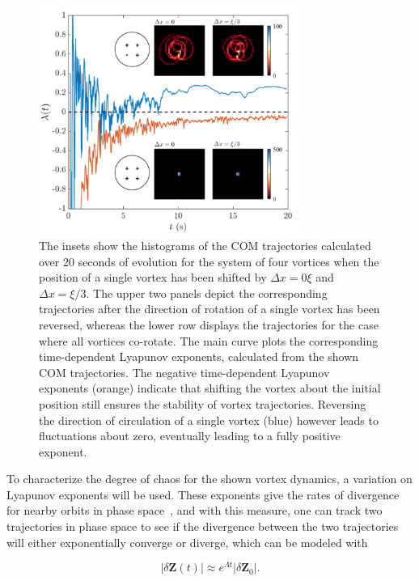 \begin{figure}
\center \includegraphics[width=0.75\textwidth]{data/2d/lyap/lyap}

\caption{
The insets show the histograms of the COM trajectories calculated over 20 seconds of evolution for the system of four vortices when the position of a single vortex has been shifted by $\Delta x=0\xi$ and $\Delta x=\xi/3$.
The upper two panels depict the corresponding trajectories after the direction of rotation of a single vortex has been reversed, whereas the lower row displays the trajectories for the case where all vortices co-rotate.
The main curve plots the corresponding time-dependent Lyapunov exponents,  calculated from the shown COM trajectories. 
The negative time-dependent Lyapunov exponents (orange) indicate that shifting the vortex about the initial position still ensures the stability of vortex trajectories. Reversing the direction of circulation of a single vortex (blue) however leads to fluctuations about zero, eventually leading to a fully positive exponent. 
}
\label{fig:lyap}
\end{figure}


To characterize the degree of chaos for the shown vortex dynamics, a variation on Lyapunov exponents will be used.
These exponents give the rates of divergence for nearby orbits in phase space~\cite{wolf1985},
and with this measure, one can track two trajectories in phase space to see if the divergence between the two trajectories will either exponentially converge or diverge, which can be modeled with

\begin{equation}
|\delta\mathbf{Z}(t)| \approx e^{\Lambda t} |\delta \mathbf{Z}_0|.
\end{equation}

